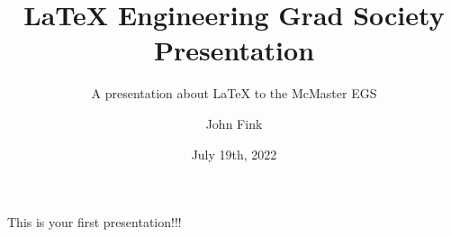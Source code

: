 \documentclass{beamer}
\title{\LaTeX{} Engineering Grad Society Presentation}
\subtitle{A presentation about LaTeX to the McMaster EGS}
\author{John Fink}
\institute{McMaster University}
\date{July 19th, 2022}
\begin{document}
	\begin{frame}
		\titlepage
	\end{frame}
	\begin{frame}
		This is your first presentation!!!
	\end{frame}
\end{document}

